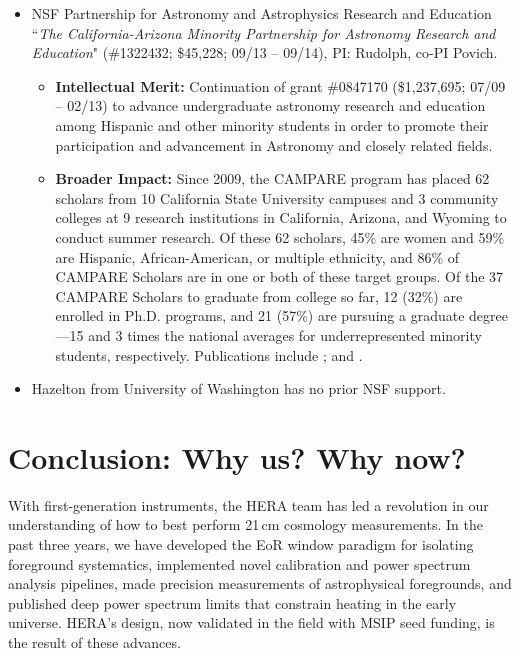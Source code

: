 \documentclass[preprint,11pt]{aastex}
\begin{document}
\begin{itemize}[noitemsep,nolistsep,leftmargin=11pt]
\item NSF Partnership for Astronomy and Astrophysics Research and Education ``{\it The California-Arizona Minority Partnership for Astronomy Research and Education}"
(\#1322432; \$45,228; 09/13 -- 09/14), PI: Rudolph, co-PI Povich.
\begin{itemize}[noitemsep,nolistsep,leftmargin=11pt]
\item{\bf Intellectual Merit:} Continuation of grant \#0847170 (\$1,237,695; 07/09 -- 02/13) to advance undergraduate astronomy research and education among Hispanic and other minority students 
in order to promote their participation and advancement in Astronomy and closely related fields.
\item{\bf Broader Impact:}
Since 2009, the CAMPARE program has placed 62 scholars from 10 California State University
campuses and 3 community colleges at 9 research institutions in California,
Arizona, and Wyoming to conduct summer research. Of these 62 scholars, 45\% are
women and 59\% are Hispanic, African-American, or multiple ethnicity, and 86\%
of CAMPARE Scholars are in one or both of these target groups. Of the
37 CAMPARE Scholars to graduate from college so far, 12 (32\%) are
enrolled in Ph.D. programs, and 21 (57\%) are pursuing a graduate
degree---15 and 3 times the national averages for underrepresented minority students, respectively. 
Publications include \citet{prather_et_al2009a,prather_et_al2009b,prather_et_al2011,schlingman_et_al2012,masiero_et_al2012,eisner_et_al2013,thompson_et_al2013,rudolph2013,eisner_et_al2015,elsaesser_et_al2014,griffith_et_al2015}; and \citet{sexton_et_al2015}.
\end{itemize}
\item Hazelton from University of Washington has no prior NSF support.

\end{itemize}


\vspace{-18pt}
\section{Conclusion: Why us? Why now?}
\vspace{-5pt}
\label{sec:conclusion}

\noindent With first-generation instruments, the HERA team has led a revolution in our understanding of how to best perform 21\,cm cosmology measurements.
In the past three years, we have developed the EoR window paradigm for isolating foreground systematics, implemented novel
calibration and power spectrum analysis pipelines, made precision measurements of astrophysical foregrounds, and published deep power 
spectrum limits that constrain heating in the early universe.  HERA's design, now validated in the field with MSIP seed funding, 
is the result of these advances.
\end{document}
